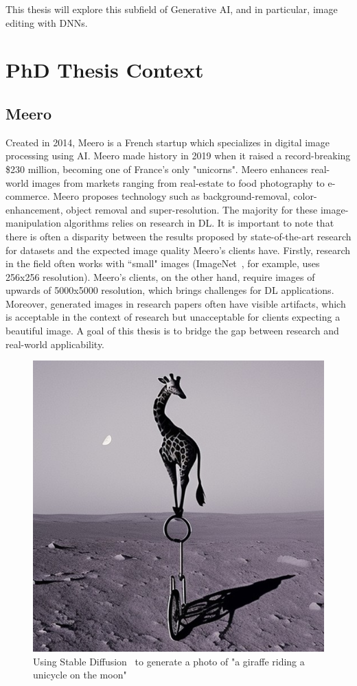 This thesis will explore this subfield of Generative \ac{AI}, and in particular, image editing with \ac{DNN}s.


\section{PhD Thesis Context}

\subsection{Meero}
Created in 2014, Meero is a French startup which specializes in digital image processing using \ac{AI}. Meero made history in 2019 when 
it raised a record-breaking \$230 million, becoming one of France's only "unicorns". Meero enhances real-world images from markets
ranging from real-estate to food photography to e-commerce. Meero proposes technology such as background-removal, color-enhancement, object 
removal and super-resolution. The majority for these image-manipulation algorithms relies on research in \ac{DL}.
It is important to note that there is often a disparity between the results proposed by state-of-the-art research for 
datasets and the expected image quality Meero's clients have. Firstly, research in the field often works with ``small" images 
(ImageNet~\citep{deng2009imagenet}, for example, uses 256x256 resolution). Meero's clients, on the other hand, require images of upwards of 5000x5000 resolution, 
which brings challenges for \ac{DL} applications.  Moreover, generated images in research papers often have 
visible artifacts, which is acceptable in the context of research but unacceptable for clients expecting a beautiful 
image. A goal of this thesis is to bridge the gap between research and real-world applicability.

\begin{figure}[tb]
    \begin{center}
        \includegraphics[width=0.5\linewidth]{images/intro/giraffe.png}
    \end{center}
    \caption{Using Stable Diffusion~\citep{rombach2022high} to generate a photo of "a giraffe riding a unicycle on the moon"}
    \label{fig:diffusion_example}
\end{figure}



